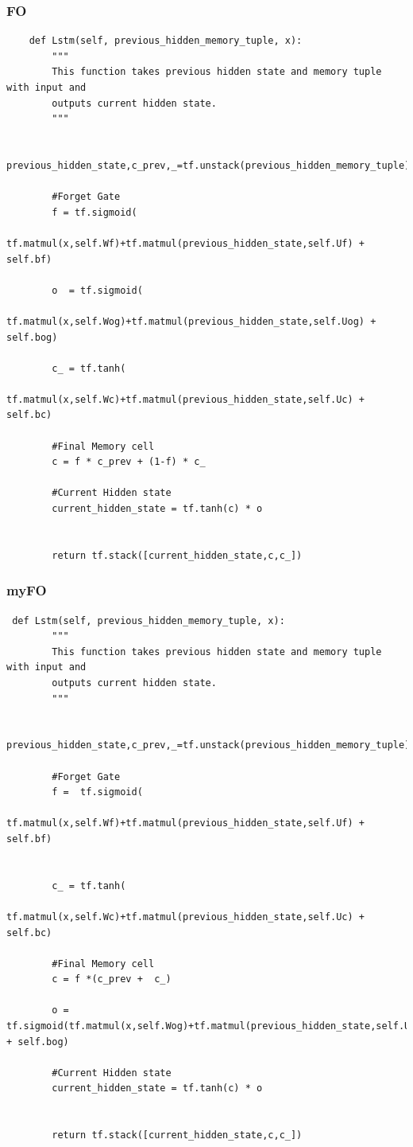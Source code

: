 \documentclass[12pt, letterpaper]{article}
\begin{document}
\subsubsection{FO}
\begin{verbatim}
    def Lstm(self, previous_hidden_memory_tuple, x):
        """
        This function takes previous hidden state and memory tuple with input and
        outputs current hidden state.
        """
        
        previous_hidden_state,c_prev,_=tf.unstack(previous_hidden_memory_tuple)

        #Forget Gate
        f = tf.sigmoid(
            tf.matmul(x,self.Wf)+tf.matmul(previous_hidden_state,self.Uf) + self.bf)
        
        o  = tf.sigmoid(
            tf.matmul(x,self.Wog)+tf.matmul(previous_hidden_state,self.Uog) + self.bog)
          
        c_ = tf.tanh(
            tf.matmul(x,self.Wc)+tf.matmul(previous_hidden_state,self.Uc) + self.bc)
        
        #Final Memory cell
        c = f * c_prev + (1-f) * c_
        
        #Current Hidden state
        current_hidden_state = tf.tanh(c) * o


        return tf.stack([current_hidden_state,c,c_])

\end{verbatim}
\subsubsection{myFO}
\begin{verbatim}
 def Lstm(self, previous_hidden_memory_tuple, x):
        """
        This function takes previous hidden state and memory tuple with input and
        outputs current hidden state.
        """
        
        previous_hidden_state,c_prev,_=tf.unstack(previous_hidden_memory_tuple)

        #Forget Gate
        f =  tf.sigmoid(
            tf.matmul(x,self.Wf)+tf.matmul(previous_hidden_state,self.Uf) + self.bf)
        
          
        c_ = tf.tanh(
            tf.matmul(x,self.Wc)+tf.matmul(previous_hidden_state,self.Uc) + self.bc)
        
        #Final Memory cell
        c = f *(c_prev +  c_)
        
        o = tf.sigmoid(tf.matmul(x,self.Wog)+tf.matmul(previous_hidden_state,self.Uog) + self.bog)
            
        #Current Hidden state
        current_hidden_state = tf.tanh(c) * o


        return tf.stack([current_hidden_state,c,c_])
\end{verbatim}
\end{document}
